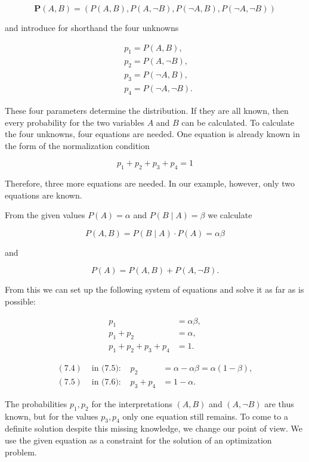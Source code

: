 \documentclass[10pt]{book}
\begin{document}
$$
\boldsymbol{P}(A, B)=(P(A, B), P(A, \neg B), P(\neg A, B), P(\neg A, \neg B))
$$

and introduce for shorthand the four unknowns

$$
\begin{aligned}
& p_{1}=P(A, B), \\
& p_{2}=P(A, \neg B), \\
& p_{3}=P(\neg A, B), \\
& p_{4}=P(\neg A, \neg B) .
\end{aligned}
$$

These four parameters determine the distribution. If they are all known, then every probability for the two variables $A$ and $B$ can be calculated. To calculate the four unknowns, four equations are needed. One equation is already known in the form of the normalization condition

$$
p_{1}+p_{2}+p_{3}+p_{4}=1
$$

Therefore, three more equations are needed. In our example, however, only two equations are known.

From the given values $P(A)=\alpha$ and $P(B \mid A)=\beta$ we calculate

$$
P(A, B)=P(B \mid A) \cdot P(A)=\alpha \beta
$$

and

$$
P(A)=P(A, B)+P(A, \neg B) .
$$

From this we can set up the following system of equations and solve it as far as is possible:

\begin{align*}
p_{1} & =\alpha \beta,  \tag{7.4}\\
p_{1}+p_{2} & =\alpha,  \tag{7.5}\\
p_{1}+p_{2}+p_{3}+p_{4} & =1. \tag{7.6}
\end{align*}

\begin{align*}
(7.4) & \text{ in (7.5): } & p_{2} & =\alpha-\alpha \beta=\alpha(1-\beta),  \tag{7.7}\\
(7.5) & \text{ in (7.6): } & p_{3}+p_{4} & =1-\alpha. \tag{7.8}
\end{align*}

The probabilities $p_{1}, p_{2}$ for the interpretations $(A, B)$ and $(A, \neg B)$ are thus known, but for the values $p_{3}, p_{4}$ only one equation still remains. To come to a definite solution despite this missing knowledge, we change our point of view. We use the given equation as a constraint for the solution of an optimization problem.
\end{document}
